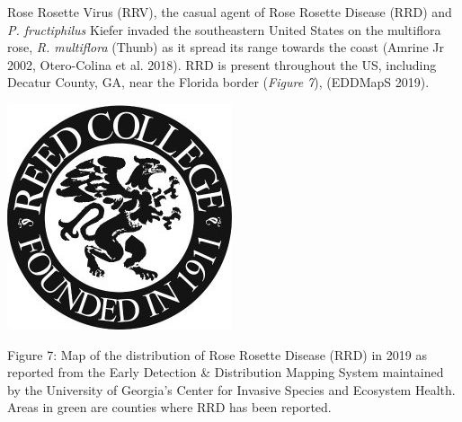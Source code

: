 \documentclass[12pt,final,CPage]{ufthesis}
\begin{document}
{  Rose Rosette Virus (RRV), the casual agent of Rose Rosette Disease (RRD) and \emph{P. fructiphilus} Kiefer invaded the southeastern United States on the multiflora rose, \emph{R. multiflora} (Thunb) as it spread its range towards the coast (Amrine Jr 2002, Otero-Colina et al. 2018). RRD is present throughout the US, including Decatur County, GA, near the Florida border (\emph{Figure 7}), (EDDMapS 2019).
  \begin{center}\includegraphics[width=0.8\linewidth]{figure/reed} \end{center}

  Figure 7: Map of the distribution of Rose Rosette Disease (RRD) in 2019 as reported from the Early Detection \& Distribution Mapping System maintained by the University of Georgia's Center for Invasive Species and Ecosystem Health. Areas in green are counties where RRD has been reported.

}
\end{document}

